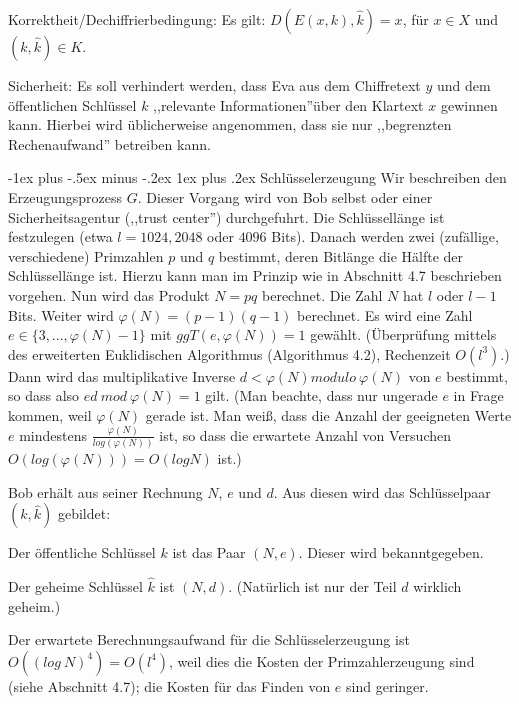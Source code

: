 \documentclass[a4paper]{article}
\makeatletter
\renewcommand{\subsubsection}{\@startsection{subsubsection}{3}{0mm}%
 {-1ex plus -.5ex minus -.2ex}%
 {1ex plus .2ex}%
 {\normalfont\small\bfseries}}
\makeatother
\begin{document}
\begin{multicols}{3}
        Korrektheit/Dechiffrierbedingung: Es gilt: $D(E(x,k), \hat{k}) =x$, für $x\in X$ und $(k,\hat{k})\in K$.

        Sicherheit: Es soll verhindert werden, dass Eva aus dem Chiffretext $y$ und dem öffentlichen Schlüssel $k$ ,,relevante Informationen''über den Klartext $x$ gewinnen kann. Hierbei wird üblicherweise angenommen, dass sie nur ,,begrenzten Rechenaufwand'' betreiben kann.

        \subsubsection{Schlüsselerzeugung}
        Wir beschreiben den Erzeugungsprozess $G$. Dieser Vorgang wird von Bob selbst oder einer Sicherheitsagentur (,,trust center'') durchgefuhrt. Die Schlüssellänge ist festzulegen (etwa $l= 1024, 2048$ oder $4096$ Bits). Danach werden zwei (zufällige, verschiedene) Primzahlen $p$ und $q$ bestimmt, deren Bitlänge die Hälfte der Schlüssellänge ist.
        Hierzu kann man im Prinzip wie in Abschnitt 4.7 beschrieben vorgehen. Nun wird das Produkt $N=pq$ berechnet. Die Zahl $N$ hat $l$ oder $l-1$ Bits. Weiter wird $\varphi(N) = (p-1)(q-1)$ berechnet. Es wird eine Zahl $e\in\{3,...,\varphi(N)-1\}$ mit $ggT(e,\varphi(N)) = 1$ gewählt. (Überprüfung mittels des erweiterten Euklidischen Algorithmus (Algorithmus 4.2), Rechenzeit $O(l^3)$.) Dann wird das multiplikative Inverse $d<\varphi(N) modulo\ \varphi(N)$ von $e$ bestimmt, so dass also $ed\ mod\ \varphi(N) = 1$ gilt. (Man beachte, dass nur ungerade $e$ in Frage kommen, weil $\varphi(N)$ gerade ist. Man weiß, dass die Anzahl der geeigneten Werte $e$ mindestens $\frac{\varphi(N)}{log(\varphi(N))}$ ist, so dass die erwartete Anzahl von Versuchen $O(log(\varphi(N)))=O(logN)$ ist.)

        Bob erhält aus seiner Rechnung $N$, $e$ und $d$. Aus diesen wird das Schlüsselpaar $(k,\hat{k})$ gebildet:
        \begin{itemize*}
            \item Der öffentliche Schlüssel $k$ ist das Paar $(N,e)$. Dieser wird bekanntgegeben.
            \item Der geheime Schlüssel $\hat{k}$ ist $(N,d)$. (Natürlich ist nur der Teil $d$ wirklich geheim.)
        \end{itemize*}

        Der erwartete Berechnungsaufwand für die Schlüsselerzeugung ist $O((log\ N)^4) =O(l^4)$, weil dies die Kosten der Primzahlerzeugung sind (siehe Abschnitt 4.7); die Kosten für das Finden von $e$ sind geringer.


\end{multicols}
\end{document}
